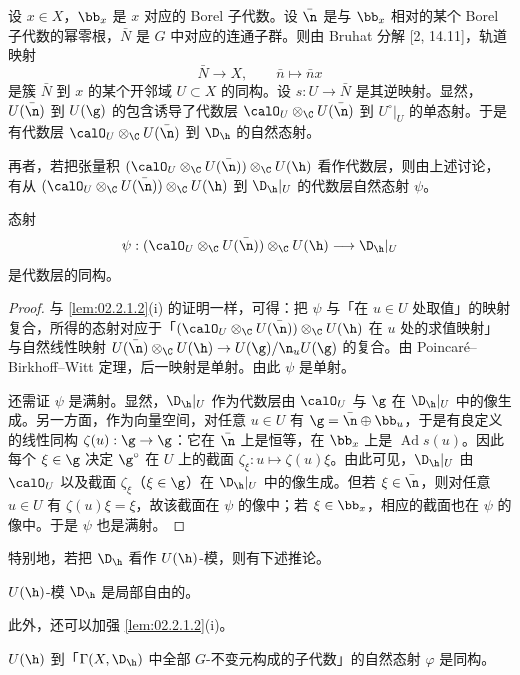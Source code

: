 设 $x\in X$，$\bb_x$ 是 $x$ 对应的 Borel 子代数。设 $\bar\n$ 是与 $\bb_x$ 相对的某个 Borel 子代数的幂零根，$\bar N$ 是 $G$ 中对应的连通子群。则由 Bruhat 分解 [2, 14.11]，轨道映射
$$\bar N\longrightarrow X,\qquad \bar n\longmapsto\bar n x$$
是簇 $\bar N$ 到 $x$ 的某个开邻域 $U\subset X$ 的同构。设 $s:U\to\bar N$ 是其逆映射。显然，$U(\bar\n)$ 到 $U(\g)$ 的包含诱导了代数层 $\calO_U\otimes_\C U(\bar\n)$ 到 $U^\circ|_U$ 的单态射。于是有代数层 $\calO_U\otimes_\C U(\bar\n)$ 到 $\D_\h$ 的自然态射。

再者，若把张量积 $(\calO_U\otimes_\C U(\bar\n))\otimes_\C U(\h)$ 看作代数层，则由上述讨论，有从 $(\calO_U\otimes_\C U(\bar\n))\otimes_\C U(\h)$ 到 $\D_\h|_U$ 的代数层自然态射 $\psi$。

\begin{lemma}\label{lem:02.2.1.3}
态射
$$\psi:(\calO_U\otimes_\C U(\bar\n))\otimes_\C U(\h)\longrightarrow\D_\h|_U$$
是代数层的同构。
\end{lemma}

\begin{proof}
与 \ref{lem:02.2.1.2}(i) 的证明一样，可得：把 $\psi$ 与「在 $u\in U$ 处取值」的映射复合，所得的态射对应于「$(\calO_U\otimes_\C U(\bar\n))\otimes_\C U(\h)$ 在 $u$ 处的求值映射」与自然线性映射 $U(\bar\n)\otimes_\C U(\h)\to U(\g)/\n_uU(\g)$ 的复合。由 Poincar\'e--Birkhoff--Witt 定理，后一映射是单射。由此 $\psi$ 是单射。

还需证 $\psi$ 是满射。显然，$\D_\h|_U$ 作为代数层由 $\calO_U$ 与 $\g$ 在 $\D_\h|_U$ 中的像生成。另一方面，作为向量空间，对任意 $u\in U$ 有 $\g=\bar\n\oplus\bb_u$，于是有良定义的线性同构 $\zeta(u):\g\to\g$：它在 $\bar\n$ 上是恒等，在 $\bb_x$ 上是 $\operatorname{Ad}s(u)$。因此每个 $\xi\in\g$ 决定 $\g^\circ$ 在 $U$ 上的截面 $\zeta_\xi:u\mapsto\zeta(u)\xi$。由此可见，$\D_\h|_U$ 由 $\calO_U$ 以及截面 $\zeta_\xi$（$\xi\in\g$）在 $\D_\h|_U$ 中的像生成。但若 $\xi\in\bar\n$，则对任意 $u\in U$ 有 $\zeta(u)\xi=\xi$，故该截面在 $\psi$ 的像中；若 $\xi\in\bb_x$，相应的截面也在 $\psi$ 的像中。于是 $\psi$ 也是满射。
\end{proof}

特别地，若把 $\D_\h$ 看作 $U(\h)$-模，则有下述推论。

\begin{corollary}\label{cor:02.2.1.4}
$U(\h)$-模 $\D_\h$ 是局部自由的。
\end{corollary}

此外，还可以加强 \ref{lem:02.2.1.2}(i)。

\begin{lemma}\label{lem:02.2.1.5}
$U(\h)$ 到「$\Gamma(X,\D_\h)$ 中全部 $G$-不变元构成的子代数」的自然态射 $\varphi$ 是同构。
\end{lemma}

